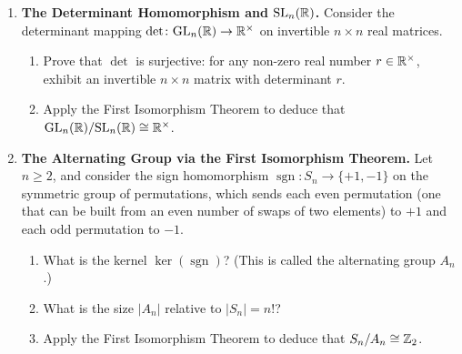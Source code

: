 \begin{enumerate}
\begin{enumerate}[label=(\alph*)]
    \item Conclude that $H \triangleleft G$.
  \end{enumerate}
  \item \textbf{The Determinant Homomorphism and $\mathrm{SL}_n(\mathbb{R})$.} Consider the determinant mapping $\det \colon \mathrm{GL}_n(\mathbb{R}) \to \mathbb{R}^\times$ on invertible $n \times n$ real matrices.
  \begin{enumerate}[label=(\alph*)]
    \item Prove that $\det$ is surjective: for any non-zero real number $r \in \mathbb{R}^\times$, exhibit an invertible $n \times n$ matrix with determinant $r$.
    \item Apply the First Isomorphism Theorem to deduce that $\mathrm{GL}_n(\mathbb{R})/\mathrm{SL}_n(\mathbb{R}) \cong \mathbb{R}^\times$.
  \end{enumerate}
  \item \textbf{The Alternating Group via the First Isomorphism Theorem.} Let $n \ge 2$, and consider the sign homomorphism $\operatorname{sgn} \colon S_n \to \{+1, -1\}$ on the symmetric group of permutations, which sends each even permutation (one that can be built from an even number of swaps of two elements) to $+1$ and each odd permutation to $-1$.
  \begin{enumerate}[label=(\alph*)]
    \item What is the kernel $\ker(\operatorname{sgn})$? (This is called the alternating group $A_n$.)
    \item What is the size $|A_n|$ relative to $|S_n| = n!$?
    \item Apply the First Isomorphism Theorem to deduce that $S_n/A_n \cong \mathbb{Z}_2$.
  \end{enumerate}
\end{enumerate}

\newpage
